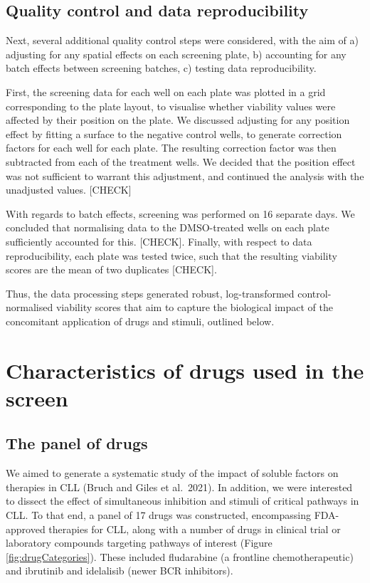 \documentclass[11pt, a4paper, twosided]{book}
\begin{document}
\hypertarget{quality-control-and-data-reproducibility}{%
\subsection{Quality control and data reproducibility}\label{quality-control-and-data-reproducibility}}

Next, several additional quality control steps were considered, with the aim of a) adjusting for any spatial effects on each screening plate, b) accounting for any batch effects between screening batches, c) testing data reproducibility.

First, the screening data for each well on each plate was plotted in a grid corresponding to the plate layout, to visualise whether viability values were affected by their position on the plate. We discussed adjusting for any position effect by fitting a surface to the negative control wells, to generate correction factors for each well for each plate. The resulting correction factor was then subtracted from each of the treatment wells. We decided that the position effect was not sufficient to warrant this adjustment, and continued the analysis with the unadjusted values. {[}CHECK{]}

With regards to batch effects, screening was performed on 16 separate days. We concluded that normalising data to the DMSO-treated wells on each plate sufficiently accounted for this. {[}CHECK{]}. Finally, with respect to data reproducibility, each plate was tested twice, such that the resulting viability scores are the mean of two duplicates {[}CHECK{]}.

Thus, the data processing steps generated robust, log-transformed control-normalised viability scores that aim to capture the biological impact of the concomitant application of drugs and stimuli, outlined below.

\hypertarget{drugs}{%
\section{Characteristics of drugs used in the screen}\label{drugs}}

\hypertarget{the-panel-of-drugs}{%
\subsection{The panel of drugs}\label{the-panel-of-drugs}}

We aimed to generate a systematic study of the impact of soluble factors on therapies in CLL (Bruch and Giles et al.~2021). In addition, we were interested to dissect the effect of simultaneous inhibition and stimuli of critical pathways in CLL. To that end, a panel of 17 drugs was constructed, encompassing FDA-approved therapies for CLL, along with a number of drugs in clinical trial or laboratory compounds targeting pathways of interest (Figure \ref{fig:drugCategories}). These included fludarabine (a frontline chemotherapeutic) and ibrutinib and idelalisib (newer BCR inhibitors).
\end{document}
